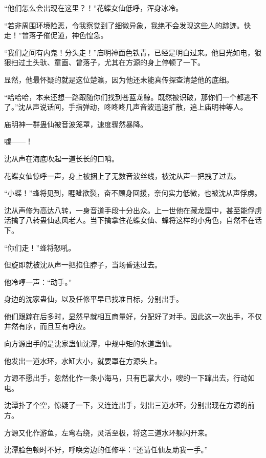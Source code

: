 
\begin{this_body}

“他们怎么会出现在这里？！”花蝶女仙低呼，浑身冰冷。

“若非周围环境险恶，令我察觉到了细微异象，我绝不会发现这些人的踪迹。快走！”曾落子催促道，神色惶急。

“我们之间有内鬼！分头走！”庙明神面色铁青，已经是明白过来。他目光如电，狠狠扫过土头驮、童画、曾落子，尤其在方源的身上停顿了一下。

显然，他最怀疑的就是这位楚瀛，因为他还未能真传探查清楚他的底细。

“哈哈哈，本来还想一路跟随你们找到苍蓝龙鲸。既然被识破，那你们一个都逃不了。”沈从声说话间，手指弹动，咚咚咚几声音波迅速扩散，追上庙明神等人。

庙明神一群蛊仙被音波笼罩，速度骤然暴降。

嘘——！

沈从声在海底吹起一道长长的口哨。

花蝶女仙惊呼一声，身上被捆上了无数音波丝线，被沈从声一把拽了过去。

“小蝶！”蜂将见到，睚眦欲裂，奋不顾身回援，奈何实力低微，也被沈从声俘虏。

沈从声修为高达八转，一身音道手段十分出众。上一世他在藏龙窟中，甚至能俘虏活擒了八转蛊仙悲风老人。当下擒拿住花蝶女仙、蜂将这样的小角色，自然不在话下。

“你们走！”蜂将怒吼。

但旋即就被沈从声一把掐住脖子，当场昏迷过去。

他冷哼一声：“动手。”

身边的沈家蛊仙，以及任修平早已找准目标，分别出手。

他们跟踪在后多时，显然早就相互商量好，分配好了对手。因此这一次出手，不仅井然有序，而且互有呼应。

向方源出手的是沈家蛊仙沈潭，中规中矩的水道蛊仙。

他发出一道水环，水缸大小，就要罩在方源头上。

方源不愿出手，忽然化作一条小海马，只有巴掌大小，嗖的一下蹿出去，行动如电。

沈潭扑了个空，惊疑了一下，又连连出手，划出三道水环，分别出现在方源的前方。

方源又化作游鱼，左弯右绕，灵活至极，将这三道水环躲闪开来。

沈潭脸色顿时不好，呼唤旁边的任修平：“还请任仙友助我一手。”


\end{this_body}
